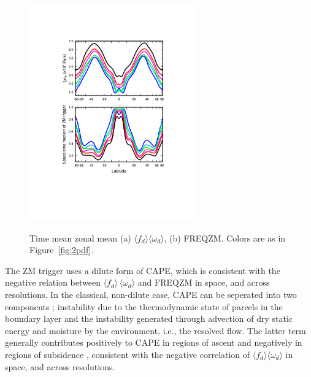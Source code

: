 \begin{figure}[t]
\begin{center}
\noindent\includegraphics[width=17pc,angle=0]{figs/temp_zonal_fracd*vomgd.pdf}\\
\end{center}
\caption{Time mean zonal mean (a) $\langle f_{d} \rangle \langle \omega_{d} \rangle$, (b) FREQZM. Colors are as in Figure~\ref{fig:2pdf}.}
\label{fig:vomg}
\end{figure}

The ZM trigger uses a dilute form of CAPE, which is consistent with the negative relation between $\overline{\langle f_{d} \rangle} \, \overline{\langle \omega_{d} \rangle}$ and FREQZM in space, and across resolutions. In the classical, non-dilute case, CAPE can be seperated into two components \citep{Z2002JGR}; instability due to the thermodynamic state of parcels in the boundary layer and the instability generated through advection of dry static energy and moisture by the environment, i.e., the resolved flow. The latter term generally contributes positively to CAPE in regions of ascent and negatively in regions of subsidence \citep{SZ2018JCLIM}, consistent with the negative correlation of $\langle f_{d} \rangle \langle \omega_{d} \rangle$ in space, and across resolutions.

